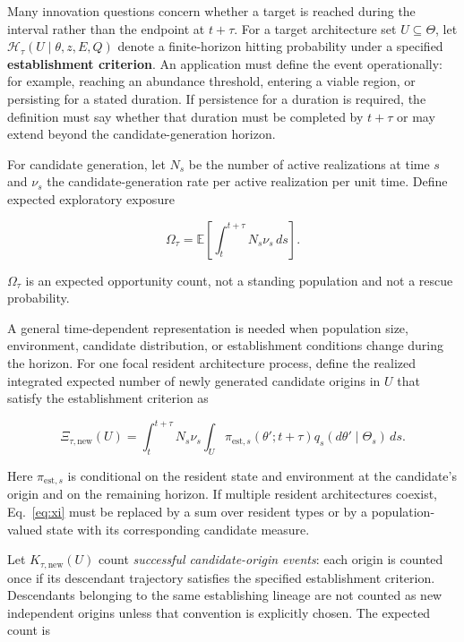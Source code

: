 \documentclass[11pt,a4paper]{article}
\begin{document}
Many innovation questions concern whether a target is reached during the interval rather than the endpoint at $t+\tau$. For a target architecture set $U\subseteq\mathsf\Theta$, let $\mathcal H_\tau(U\mid\theta,z,E,Q)$ denote a finite-horizon hitting probability under a specified \textbf{establishment criterion}. An application must define the event operationally: for example, reaching an abundance threshold, entering a viable region, or persisting for a stated duration. If persistence for a duration is required, the definition must say whether that duration must be completed by $t+\tau$ or may extend beyond the candidate-generation horizon.

For candidate generation, let $N_s$ be the number of active realizations at time $s$ and $\nu_s$ the candidate-generation rate per active realization per unit time. Define expected exploratory exposure

\begin{equation}
\boxed{
\Omega_\tau
=
\mathbb E\!\left[
\int_t^{t+\tau}N_s\nu_s\,ds
\right].
}
\label{eq:omega}
\end{equation}

$\Omega_\tau$ is an expected opportunity count, not a standing population and not a rescue probability.

A general time-dependent representation is needed when population size, environment, candidate distribution, or establishment conditions change during the horizon. For one focal resident architecture process, define the realized integrated expected number of newly generated candidate origins in $U$ that satisfy the establishment criterion as

\begin{equation}
\Xi_{\tau,\mathrm{new}}(U)
=
\int_t^{t+\tau}
N_s\nu_s
\int_U
\pi_{\mathrm{est},s}(\theta';t+\tau)
q_s(d\theta'\mid\Theta_s)
\,ds.
\label{eq:xi}
\end{equation}

Here $\pi_{\mathrm{est},s}$ is conditional on the resident state and environment at the candidate's origin and on the remaining horizon. If multiple resident architectures coexist, Eq.~\eqref{eq:xi} must be replaced by a sum over resident types or by a population-valued state with its corresponding candidate measure.

Let $K_{\tau,\mathrm{new}}(U)$ count \emph{successful candidate-origin events}: each origin is counted once if its descendant trajectory satisfies the specified establishment criterion. Descendants belonging to the same establishing lineage are not counted as new independent origins unless that convention is explicitly chosen. The expected count is
\end{document}
